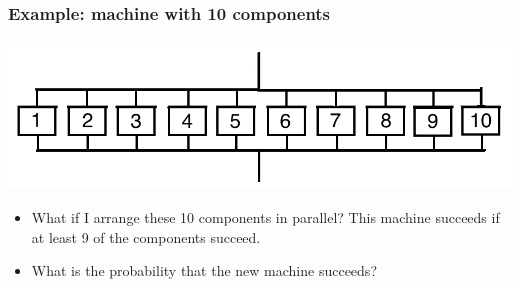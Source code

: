 \documentclass[handout]{beamer}\usepackage[]{graphicx}\usepackage[]{color}
\numberwithin{equation}{section}
\begin{document}
\begin{frame}
\frametitle{Example: machine with 10 components}

\begin{center}
 \includegraphics{../../fig/mach3.png}
\end{center}

\begin{itemize}
\pause \item What if I arrange these 10 components in parallel? This machine succeeds if at least 9 of the components succeed.
\pause \item What is the probability that the new machine succeeds?
\end{itemize}


\end{frame}
\end{document}
